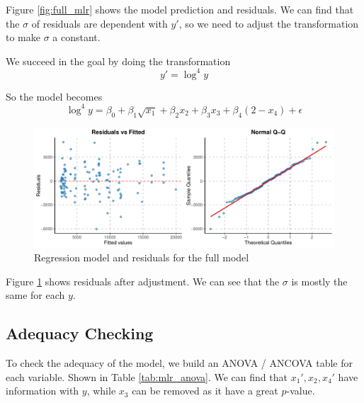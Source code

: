 Figure \ref{fig:full_mlr} shows the model prediction and residuals. We can find that the $\sigma$ of residuals are dependent with $y'$, so we need to adjust the transformation to make $\sigma$ a constant.

We succeed in the goal by doing the transformation
\begin{equation}\label{eq:trans_y_mlr}
y' = \log^4 y
\end{equation}

So the model becomes
\begin{equation}\label{eq:adjusted_model}
    \log^4 y = \beta_0 +\beta_1 \sqrt{x_1} + \beta_2 x_2 +\beta_3 x_3 + \beta_4 (2 - x_4) + \epsilon
\end{equation}

\begin{figure}
    \centering
    \includegraphics[width=1\linewidth]{figures/mlr/residuals_vs_fitted_qqplot_transformed.pdf}
    \caption{Regression model and residuals for the full model}
    \label{fig:adjust_mlr}
\end{figure}

Figure \ref{fig:adjust_mlr} shows residuals after adjustment. We can see that the $\sigma$ is mostly the same for each $y$.

\subsection{Adequacy Checking}

To check the adequacy of the model, we build an ANOVA / ANCOVA table for each variable. Shown in Table \ref{tab:mlr_anova}. We can find that $x_1', x_2, x_4'$ have information with $y$, while $x_3$ can be removed as it have a great $p$-value.

